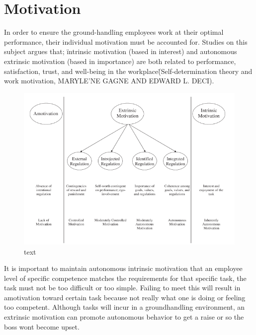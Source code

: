\section{Motivation}

In order to ensure the ground-handling employees work at their optimal performance, their individual motivation must be accounted for. Studies on this subject argues that; \"intrinsic motivation (based in interest) and autonomous extrinsic motivation (based in importance) are both related to performance, satisfaction, trust, and well-being in the workplace\" (Self-determination theory and work motivation, MARYLE'NE GAGNE AND EDWARD L. DECI).

\begin{figure}
\centering
\includegraphics[width=\pagewidth]{Grafik/Motivation}
\caption{text}
\label{Hackman}
\end{figure}

It is important to maintain autonomous intrinsic motivation that an employee level of specific competence matches the requirements for that specific task, the task must not be too difficult or too simple. Failing to meet this will result in amotivation toward certain task because not really what one is doing or feeling too competent. Although tasks will incur in a groundhandling environment, an extrinsic motivation can promote autonomous behavior to get a raise or so the boss wont become upset.

